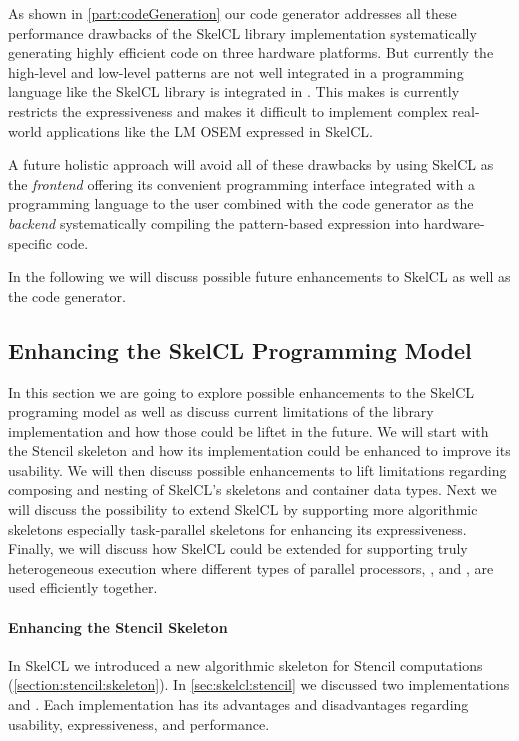As shown in \autoref{part:codeGeneration} our code generator addresses all these performance drawbacks of the SkelCL library implementation systematically generating highly efficient code on three hardware platforms.
But currently the high-level and low-level patterns are not well integrated in a programming language like the SkelCL library is integrated in \Cpp.
This makes is currently restricts the expressiveness and makes it difficult to implement complex real-world applications like the LM OSEM expressed in SkelCL.

A future holistic approach will avoid all of these drawbacks by using SkelCL as the \emph{frontend} offering its convenient programming interface integrated with a programming language to the user combined with the code generator as the \emph{backend} systematically compiling the pattern-based expression into hardware-specific code.

\bigskip
In the following we will discuss possible future enhancements to SkelCL as well as the code generator.

\subsection{Enhancing the SkelCL Programming Model}
\label{section:future-work:skelcl}

In this section we are going to explore possible enhancements to the SkelCL programing model as well as discuss current limitations of the \Cpp library implementation and how those could be liftet in the future.
We will start with the Stencil skeleton and how its implementation could be enhanced to improve its usability.
We will then discuss possible enhancements to lift limitations regarding composing and nesting of SkelCL's skeletons and container data types.
Next we will discuss the possibility to extend SkelCL by supporting more algorithmic skeletons especially task-parallel skeletons for enhancing its expressiveness.
Finally, we will discuss how SkelCL could be extended for supporting truly heterogeneous execution where different types of parallel processors, \eg, \CPU and \GPU, are used efficiently together.

\paragraph{Enhancing the Stencil Skeleton}
In SkelCL we introduced a new algorithmic skeleton for Stencil computations (\autoref{section:stencil:skeleton}).
In \autoref{sec:skelcl:stencil} we discussed two implementations  and .
Each implementation has its advantages and disadvantages regarding usability, expressiveness, and performance.

